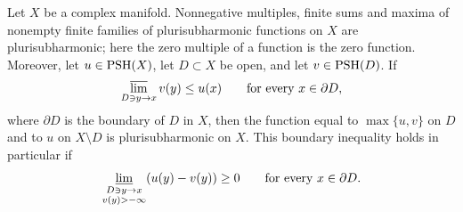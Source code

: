 \begin{proposition}\label{prop:psh-max-gluing}
Let $X$ be a complex manifold. Nonnegative multiples, finite sums and maxima of nonempty finite families of plurisubharmonic functions on $X$ are plurisubharmonic; here the zero multiple of a function is the zero function. Moreover, let $u\in\mathrm{PSH}(X)$, let $D\subset X$ be open, and let $v\in\mathrm{PSH}(D)$. If
\[
 \varlimsup_{D\ni y\to x}v(y)\le u(x)\qquad\text{for every }x\in\partial D,
\]
where $\partial D$ is the boundary of $D$ in $X$, then the function equal to $\max\{u,v\}$ on $D$ and to $u$ on $X\setminus D$ is plurisubharmonic on $X$. This boundary inequality holds in particular if
\[
 \varliminf_{\substack{D\ni y\to x\\v(y)>-\infty}}(u(y)-v(y))\ge0
 \qquad\text{for every }x\in\partial D.
\]
\end{proposition}
